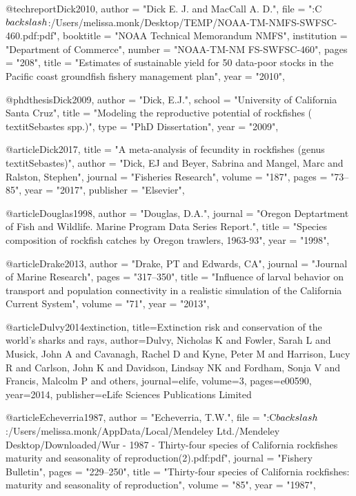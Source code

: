 @techreport{Dick2010,
    author = "{Dick E. J. and MacCall A. D.}",
    file = "{:C$\\backslash$:/Users/melissa.monk/Desktop/TEMP/NOAA-TM-NMFS-SWFSC-460.pdf:pdf}",
    booktitle = "{NOAA Technical Memorandum NMFS}",
    institution = "{Department of Commerce}",
    number = "{NOAA-TM-NM FS-SWFSC-460}",
    pages = "{208}",
    title = "{{Estimates of sustainable yield for 50 data-poor stocks in the Pacific coast groundfish fishery management plan}}",
    year = "{2010}",
}

@phdthesis{Dick2009,
    author = "{Dick, E.J.}",
    school = "{University of California Santa Cruz}",
    title = "{{Modeling the reproductive potential of rockfishes (\\textit{{Sebastes}} spp.)}}",
    type = "{PhD Dissertation}",
    year = "{2009}",
}

@article{Dick2017,
    title = "{A meta-analysis of fecundity in rockfishes (genus \\textit{{{Sebastes}}})}",
    author = "{Dick, EJ and Beyer, Sabrina and Mangel, Marc and Ralston, Stephen}",
    journal = "{Fisheries Research}",
    volume = "{187}",
    pages = "{73--85}",
    year = "{2017}",
    publisher = "{Elsevier}",
}

@article{Douglas1998,
    author = "{Douglas, D.A.}",
    journal = "{Oregon Deptartment of Fish and Wildlife. Marine Program Data Series Report.}",
    title = "{{Species composition of rockfish catches by Oregon trawlers, 1963-93}}",
    year = "{1998}",
}

@article{Drake2013,
    author = "{Drake, PT and Edwards, CA}",
    journal = "{Journal of Marine Research}",
    pages = "{317--350}",
    title = "{{Influence of larval behavior on transport and population connectivity in a realistic simulation of the California Current System}}",
    volume = "{71}",
    year = "{2013}",
}

@article{Dulvy2014extinction,
  title={Extinction risk and conservation of the world’s sharks and rays},
  author={Dulvy, Nicholas K and Fowler, Sarah L and Musick, John A and Cavanagh, Rachel D and Kyne, Peter M and Harrison, Lucy R and Carlson, John K and Davidson, Lindsay NK and Fordham, Sonja V and Francis, Malcolm P and others},
  journal={elife},
  volume={3},
  pages={e00590},
  year={2014},
  publisher={eLife Sciences Publications Limited}
}

@article{Echeverria1987,
    author = "{Echeverria, T.W.}",
    file = "{:C$\\backslash$:/Users/melissa.monk/AppData/Local/Mendeley Ltd./Mendeley Desktop/Downloaded/Wur - 1987 - Thirty-four species of California rockfishes maturity and seasonality of reproduction(2).pdf:pdf}",
    journal = "{Fishery Bulletin}",
    pages = "{229--250}",
    title = "{{Thirty-four species of California rockfishes: maturity and seasonality of reproduction}}",
    volume = "{85}",
    year = "{1987}",
}

